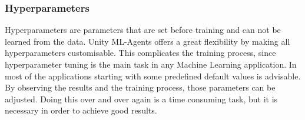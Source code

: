 \subsubsection{Hyperparameters}
Hyperparameters are parameters that are set before training and can not be learned from the data.
Unity ML-Agents offers a great flexibility by making all hyperparameters customisable.
This complicates the training process, since hyperparameter tuning is the main task in any Machine Learning application.
In most of the applications starting with some predefined default values is advisable.
By observing the results and the training process, those parameters can be adjusted.
Doing this over and over again is a time consuming task, but it is necessary in order to achieve good results.
